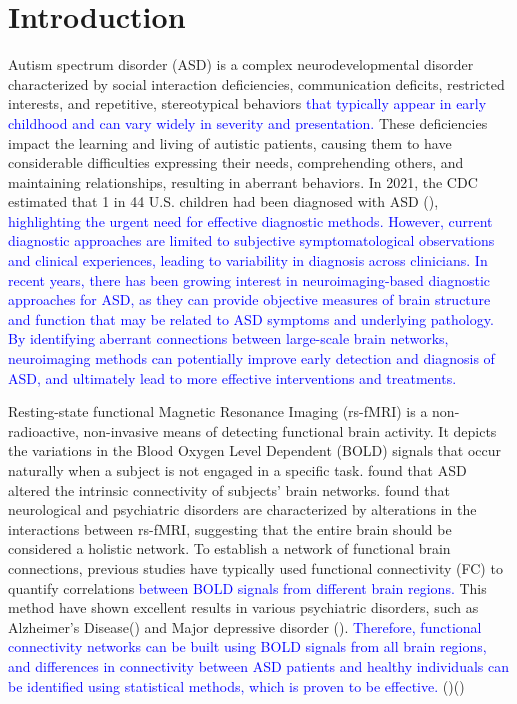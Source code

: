 \documentclass[a4paper]{cas-dc}
\begin{document}
\section{Introduction}\label{Introduction}
Autism spectrum disorder (ASD) is a complex neurodevelopmental disorder characterized by social interaction deficiencies, communication deficits, restricted interests, and repetitive, stereotypical behaviors \textcolor{blue}{that typically appear in early childhood and can vary widely in severity and presentation.} These deficiencies impact the learning and living of autistic patients, causing them to have considerable difficulties expressing their needs, comprehending others, and maintaining relationships, resulting in aberrant behaviors. In 2021, the CDC estimated that 1 in 44 U.S. children had been diagnosed with ASD (\cite{maenner2021prevalence}), \textcolor{blue}{highlighting the urgent need for effective diagnostic methods. However, current diagnostic approaches are limited to subjective symptomatological observations and clinical experiences, leading to variability in diagnosis across clinicians. In recent years, there has been growing interest in neuroimaging-based diagnostic approaches for ASD, as they can provide objective measures of brain structure and function that may be related to ASD symptoms and underlying pathology. By identifying aberrant connections between large-scale brain networks, neuroimaging methods can potentially improve early detection and diagnosis of ASD, and ultimately lead to more effective interventions and treatments.}

Resting-state functional Magnetic Resonance Imaging (rs-fMRI) is a non-radioactive, non-invasive means of detecting functional brain activity. It depicts the variations in the Blood Oxygen Level Dependent (BOLD) signals that occur naturally when a subject is not engaged in a specific task. \cite{monk2009abnormalities} found that ASD altered the intrinsic connectivity of subjects' brain networks. \cite{woodward2015resting} found that neurological and psychiatric disorders are characterized by alterations in the interactions between rs-fMRI, suggesting that the entire brain should be considered a holistic network. To establish a network of functional brain connections, previous studies have typically used functional connectivity (FC) to quantify correlations \textcolor{blue}{between BOLD signals from different brain regions.} This method have shown excellent results in various psychiatric disorders, such as Alzheimer's Disease(\cite{ju2017early}) and Major depressive disorder (\cite{zeng2012identifying}). \textcolor{blue}{Therefore, functional connectivity networks can be built using BOLD signals from all brain regions, and differences in connectivity between ASD patients and healthy individuals can be identified using statistical methods, which is proven to be effective.} (\cite{woodward2015resting})(\cite{assaf2010abnormal})
\end{document}
